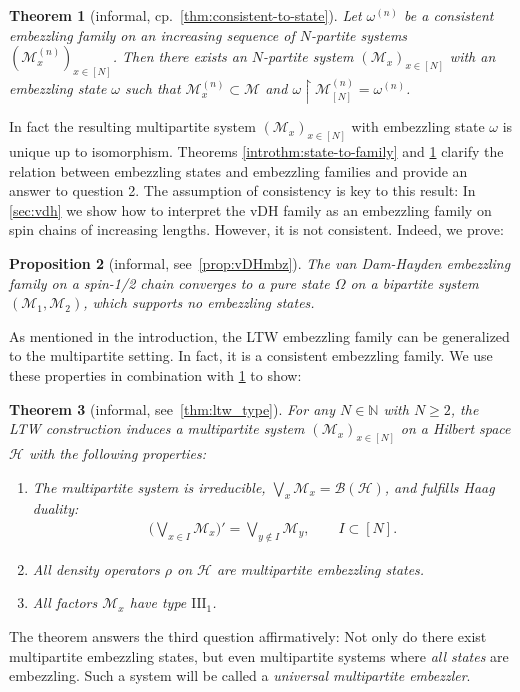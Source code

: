 \documentclass[a4paper, 10pt, onecolumn, accepted=2025-07-22]{quantumarticle}
\newtheorem{introtheorem}{Theorem} %
\newtheorem{introproposition}[introtheorem]{Proposition}
\theoremstyle{definition}
\newcommand{\mc}{\mathcal}
\newcommand{\III}{{\mathrm{III}}}
\def\B{{\mc B}}
\def\H{{\mc H}}
\def\M{{\mc M}}
\def\NN{{\mathbb N}}
\newcommand*{\1}{\text{\usefont{U}{bbold}{m}{n}1}}
\begin{document}
\begin{introtheorem}[informal, cp.~\cref{thm:consistent-to-state}]\label{introthm:family-to-state} Let $\omega^{(n)}$ be a consistent embezzling family on an increasing sequence of $N$-partite systems $(\M^{(n)}_x)_{x\in[N]}$. Then there exists an $N$-partite system $(\M_x)_{x\in[N]}$ with an embezzling state $\omega$ such that $\M^{(n)}_x \subset \M$ and $\omega \restriction \M^{(n)}_{[N]} = \omega^{(n)}$. 
\end{introtheorem}
In fact the resulting multipartite system $(\M_x)_{x\in[N]}$ with embezzling state $\omega$ is unique up to isomorphism.
Theorems \ref{introthm:state-to-family} and \ref{introthm:family-to-state} clarify the relation between embezzling states and embezzling families and provide an answer to question 2.
The assumption of consistency is key to this result: In \cref{sec:vdh} we show how to interpret the vDH family as an embezzling family on spin chains of increasing lengths. 
However, it is not consistent. Indeed, we prove:

\begin{introproposition}[informal, see~\cref{prop:vDHmbz}]\label{introthm:vdh}
    The van Dam-Hayden embezzling family on a spin-1/2 chain converges to a pure state $\Omega$ on a bipartite system $(\M_1,\M_2)$, which supports no embezzling states.
\end{introproposition}

As mentioned in the introduction, the LTW embezzling family can be generalized to the multipartite setting. In fact, it is a consistent embezzling family. We use these properties in combination with \cref{introthm:family-to-state} to show:
\begin{introtheorem}[informal,  see~\cref{thm:ltw_type}]\label{introthm:ltw}
For any $N\in\NN$ with $N\geq 2$, the LTW construction induces a multipartite system $(\M_x)_{x\in[N]}$ on a Hilbert space $\H$ with the following properties:
\begin{enumerate}
\item The multipartite system is irreducible, $\bigvee_x \M_x = \B(\H)$, and fulfills \emph{Haag duality}:
\begin{align}
    \bigg(\bigvee_{x\in I} \M_x\bigg)' = \bigvee_{y\notin I }\M_y,\qquad I \subset[N].
\end{align}
\item All density operators $\rho$ on $\H$ are multipartite embezzling states.

\item All factors $\M_x$ have type $\III_1$. 
\end{enumerate}
\end{introtheorem}
The theorem answers the third question affirmatively: Not only do there exist multipartite embezzling states, but even multipartite systems where \emph{all states} are embezzling.
Such a system will be called a \emph{universal multipartite embezzler}.
\end{document}
